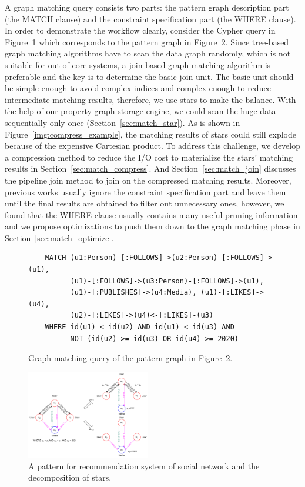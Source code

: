 A graph matching query consists two parts: the pattern graph description part (the MATCH clause) and the constraint specification part (the WHERE clause).
In order to demonstrate the workflow clearly,
consider the Cypher query in Figure~\ref{img:cypher_query} which corresponds to the pattern graph in Figure~\ref{img:pattern_graph}.
Since tree-based graph matching algorithms have to scan the data graph randomly,
which is not suitable for out-of-core systems,
a join-based graph matching algorithm is preferable and the key is to determine the basic join unit.
The basic unit should be simple enough to avoid complex indices and complex enough to reduce intermediate matching results, therefore, we use stars to make the balance.
With the help of our property graph storage engine, we could scan the huge data sequentially only once (Section~\ref{sec:match_star}).
As is shown in Figure~\ref{img:compress_example}, the matching results of stars could still explode because of the expensive Cartesian product.
To address this challenge, we develop a compression method to reduce the I/O cost to materialize the stars' matching results in Section~\ref{sec:match_compress}.
And Section~\ref{sec:match_join} discusses the pipeline join method to join on the compressed matching results.
Moreover, previous works usually ignore the constraint specification part and leave them until the final results are obtained to filter out unnecessary ones,
however, we found that the WHERE clause usually contains many useful pruning information and we propose optimizations to push them down to the graph matching phase in Section~\ref{sec:match_optimize}.
\begin{figure}[ht]
  \begin{verbatim}
    MATCH (u1:Person)-[:FOLLOWS]->(u2:Person)-[:FOLLOWS]->(u1),
          (u1)-[:FOLLOWS]->(u3:Person)-[:FOLLOWS]->(u1),
          (u1)-[:PUBLISHES]->(u4:Media), (u1)-[:LIKES]->(u4),
          (u2)-[:LIKES]->(u4)<-[:LIKES]-(u3)
    WHERE id(u1) < id(u2) AND id(u1) < id(u3) AND
          NOT (id(u2) >= id(u3) OR id(u4) >= 2020)
  \end{verbatim}
  \caption{Graph matching query of the pattern graph in Figure~\ref{img:pattern_graph}.}\label{img:cypher_query}
\end{figure}
\begin{figure}[ht]
  \centering
  \includegraphics[width=0.48\textwidth]{img/pattern_graph.pdf}
  \caption{A pattern for recommendation system of social network and the decomposition of stars.}\label{img:pattern_graph}
\end{figure}
